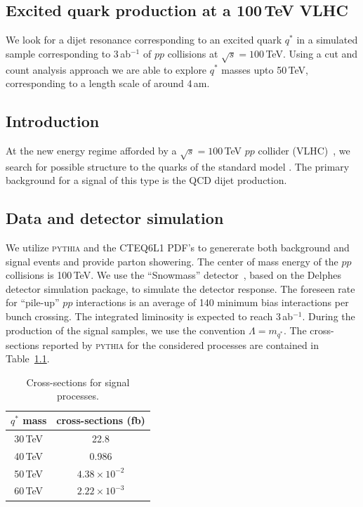 \begin{boldmath}
\chapter{Excited quark production at a 100\,TeV VLHC}
\label{chap:VLHC_Qstar}
\end{boldmath}



We look for a dijet resonance corresponding to an excited quark $q^*$
in a simulated sample corresponding to 3\,ab$^{-1}$ of $pp$ collisions
at $\sqrt{s} = 100$\,TeV.  Using a cut and count analysis approach we
are able to explore $q^*$ masses upto 50\,TeV, corresponding to a
length scale of around 4\,am.

\section{Introduction}

At the new energy regime afforded by a $\sqrt{s} =100$\,TeV $pp$
collider (VLHC)~\cite{Ambrosio:2001ej}, we search for possible
structure to the quarks of the standard model \cite{Baur:1989kv,
  Baur:1987ga, Harris:1996ct}.  The primary background for a signal of
this type is the QCD dijet production.

\section{Data and detector simulation}

We utilize \textsc{pythia} and the CTEQ6L1 PDF's to genererate both
background and signal events and provide parton showering.  The center
of mass energy of the $pp$ collisions is 100\,TeV.  We use the
``Snowmass'' detector~\cite{SnowDet}, based on the
Delphes~\cite{Delphes} detector simulation package, to simulate the
detector response.  The foreseen rate for ``pile-up'' $pp$
interactions is an average of 140 minimum bias interactions per bunch
crossing.  The integrated liminosity is expected to reach
3\,ab$^{-1}$.  During the production of the signal samples, we use the
convention $\Lambda = m_{q^*}$.  The cross-sections reported by
\textsc{pythia} for the considered processes are contained in
Table~\ref{tab:qstar_xsec}.

\begin{table}
\caption{\label{tab:qstar_xsec} Cross-sections for signal processes.}
\begin{center}
\begin{tabular}{|c|c|}
\hline
$q^*$ mass & cross-sections (fb) \\
\hline
30\,TeV & 22.8 \\
40\,TeV & 0.986 \\
50\,TeV & $4.38\times 10^{-2}$ \\
60\,TeV & $2.22\times 10^{-3}$ \\
\hline
\end{tabular}
\end{center}
\end{table}

